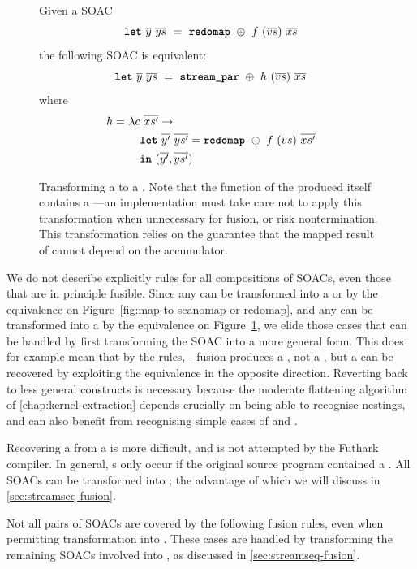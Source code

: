 \begin{figure}[bt]
  Given a SOAC
\[
  \mbox{\texttt{\bfseries{let}}}~\overline{y}~\overline{ys}~=~\mbox{\texttt{\bfseries{redomap}}}~\oplus~f~(\overline{vs})~\overline{xs}
\]
the following SOAC is equivalent:
\[
  \mbox{\texttt{\bfseries{let}}}~\overline{y}~\overline{ys}~=~\mbox{\texttt{\bfseries{stream\_par}}}~\oplus~h~(\overline{vs})~\overline{xs}
\]
where \begin{align*}
        h =~& \lambda c~\overline{xs'} \rightarrow \\
            & \quad \mbox{\texttt{\bfseries{let}}}~\overline{y'}~\overline{ys'} = \mbox{\texttt{\bfseries{redomap}}}~\oplus~f~(\overline{vs})~\overline{xs'} \\
            & \quad \mbox{\texttt{\bfseries{in}}}~(\overline{y'}, \overline{ys'})
  \end{align*}
  \caption{Transforming a  to a \StreamPar.  Note that the
    function of the produced \StreamPar{} itself contains a
    ---an implementation must take care not to apply this
    transformation when unnecessary for fusion, or risk
    nontermination.  This transformation relies on the guarantee that
    the mapped result of  cannot depend on the accumulator.}
  \label{fig:redomap-to-streamred}
\end{figure}

We do not describe explicitly rules for all compositions of SOACs,
even those that are in principle fusible.  Since any  can be
transformed into a  or  by the equivalence on
Figure~\ref{fig:map-to-scanomap-or-redomap}, and any  can
be transformed into a \StreamPar{} by the equivalence on
Figure~\ref{fig:redomap-to-streamred}, we elide those cases that can
be handled by first transforming the SOAC into a more general form.
This does for example mean that by the rules, - fusion
produces a , not a , but a  can be
recovered by exploiting the equivalence in the opposite direction.
Reverting back to less general constructs is necessary because the
moderate flattening algorithm of \cref{chap:kernel-extraction} depends
crucially on being able to recognise  nestings, and can also
benefit from recognising simple cases of  and .

Recovering a  from a \StreamPar{} is more difficult, and is
not attempted by the Futhark compiler.  In general, \StreamPar{}s only
occur if the original source program contained a \StreamRed{}.  All
SOACs can be transformed into \StreamSeq; the advantage of which we
will discuss in \cref{sec:streamseq-fusion}.

Not all pairs of SOACs are covered by the following fusion rules, even
when permitting transformation into \StreamPar{}.  These cases are
handled by transforming the remaining SOACs involved into
\StreamSeq{}, as discussed in \cref{sec:streamseq-fusion}.

